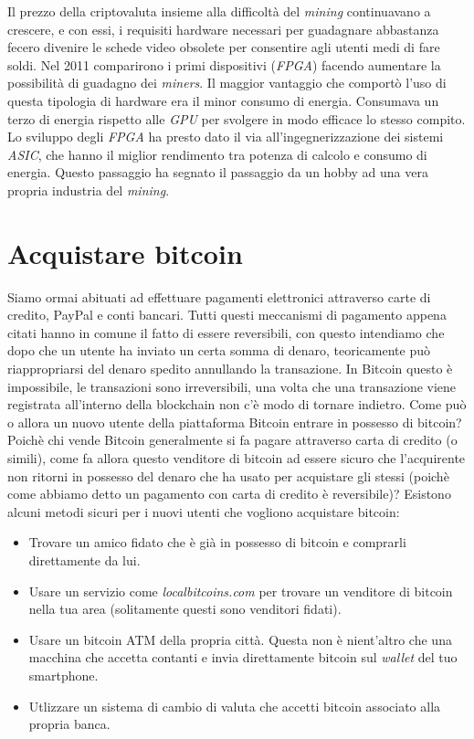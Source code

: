 Il prezzo della criptovaluta insieme alla difficolt\`a del \textit{mining} continuavano a crescere, e con essi, i requisiti hardware necessari per guadagnare abbastanza fecero divenire le schede video obsolete per consentire agli utenti medi di fare soldi. Nel 2011 comparirono i primi dispositivi (\textit{FPGA}) facendo aumentare la possibilit\`a di guadagno dei \textit{miners}.
Il maggior vantaggio che comport\`o l'uso di questa tipologia di hardware era il minor consumo di energia. Consumava un terzo di energia rispetto alle \textit{GPU} per svolgere in modo efficace lo stesso compito.
Lo sviluppo degli \textit{FPGA} ha presto dato il via all'ingegnerizzazione dei sistemi \textit{ASIC}, che hanno il miglior rendimento tra potenza di calcolo e consumo di energia. Questo passaggio ha segnato il passaggio da un hobby ad una vera propria industria del \textit{mining}.

 





\section{Acquistare bitcoin}
Siamo ormai abituati ad effettuare pagamenti elettronici attraverso 
carte di credito, PayPal e conti bancari. Tutti questi meccanismi di pagamento appena citati hanno in comune il fatto di essere reversibili, con questo intendiamo che dopo che un utente ha inviato un certa somma di denaro, teoricamente pu\`o riappropriarsi del denaro spedito annullando la transazione. In Bitcoin questo \`e impossibile, le transazioni sono irreversibili, una volta che una transazione viene registrata all'interno della blockchain non c'\`e modo di tornare indietro. Come pu\`o o allora un nuovo utente della piattaforma Bitcoin entrare in possesso di bitcoin?\\
Poich\`e chi vende Bitcoin generalmente si fa pagare attraverso carta di credito (o simili), come fa allora questo venditore di bitcoin ad essere sicuro che l'acquirente non ritorni in possesso del denaro che ha usato per acquistare gli stessi (poich\`e come abbiamo detto un pagamento con carta di credito \`e reversibile)? Esistono alcuni metodi sicuri per i nuovi utenti che vogliono acquistare bitcoin: 
\begin{itemize}
\item Trovare un amico fidato che \`e gi\`a in possesso di bitcoin e comprarli direttamente da lui.
\item Usare un servizio come \textit{localbitcoins.com} per trovare un venditore di bitcoin nella tua area (solitamente questi sono venditori fidati).
\item Usare un bitcoin ATM della propria citt\`a. Questa non \`e nient'altro che una macchina che accetta contanti e invia direttamente bitcoin sul \textit{wallet} del tuo smartphone.
\item Utlizzare un sistema di cambio di valuta che accetti bitcoin associato alla propria banca.
\end{itemize}


